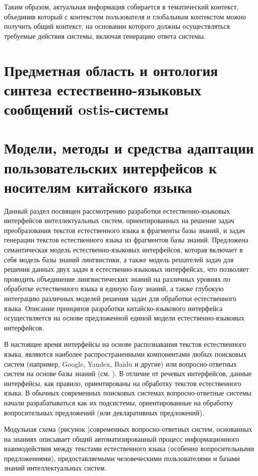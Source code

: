 Таким образом, актуальная информация собирается в тематический контекст, объединив который с контекстом пользователя и глобальным контекстом можно получить общий контекст, на основании которого должны осуществляться требуемые действия системы, включая генерацию ответа системы.

\section{Предметная область и онтология синтеза естественно-языковых сообщений ostis-системы}
\section{Модели, методы и средства адаптации пользовательских интерфейсов к носителям китайского языка}
\label{section_chinese_interfaces}
Данный раздел посвящен рассмотрению разработки естественно-языковых интерфейсов интеллектуальных систем, ориентированных на решение задач преобразования текстов естественного языка в фрагменты базы знаний, и задач генерации текстов естественного языка из фрагментов базы знаний. Предложена семантическая модель естественно-языковых интерфейсов, которая включает в себя модель базы знаний лингвистики, а также модель решателей задач для решения данных двух задач в естественно-языковых интерфейсах, что позволяет проводить объединение лингвистических знаний на различных уровнях по обработке естественного языка в единую базу знаний, а также глубокую интеграцию различных моделей решения задач для обработки естественного языка. Описание принципов разработки китайско-языкового интерфейса осуществляется на основе предложенной единой модели естественно-языковых интерфейсов.

В настоящее время интерфейсы на основе распознавания текстов естественного языка, являются наиболее распространенными компонентами любых поисковых систем (например, Google, Yandex, Baidu и другие) или вопросно-ответных систем на основе базы знаний (см. ). В отличие от речевых интерфейсов, данные интерфейсы, как правило, ориентированы на обработку текстов естественного языка. В обычных современных поисковых системах вопросно-ответные системы начали разрабатываться как их подсистемы, ориентированные на обработку вопросительных предложений (или декларативных предложений).

Модульная схема (рисунок \textit{})современных вопросно-ответных систем, основанных на знаниях описывает общий автоматизированный процесс информационного взаимодействия между текстами естественного языка (особенно вопросительными предложениями), предоставляемыми человеческими пользователями и базами знаний интеллектуальных систем.

